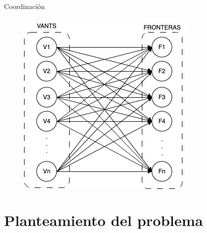 \documentclass[24pt,aspectratio=169]{beamer}
\begin{document}
\begin{frame}{Coordinación}
\begin{figure}[ht!]
\begin{minipage}{0.48\textwidth}
      \centering
      \includegraphics[width=0.5\linewidth]{asignacion} %
    \end{minipage}
  \end{figure}
\end{frame}

\section*{Planteamiento del problema}
\end{document}
